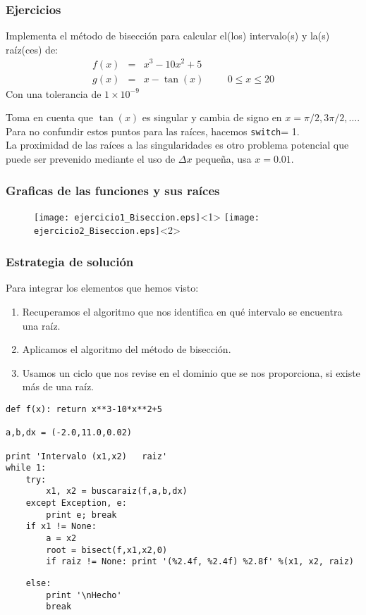 \begin{frame}
\frametitle{Ejercicios}
Implementa el método de bisección para calcular el(los) intervalo(s) y la(s) raíz(ces) de:
\begin{eqnarray*}
	f(x) &=& x^{3} - 10x^{2} + 5 \\
	g(x) &=& x- \tan(x) \hspace{1cm} 0 \leq x \leq 20
\end{eqnarray*}
Con una tolerancia de $1\times 10^{-9}$
\end{frame}
\begin{frame}
Toma en cuenta que $\tan(x)$ es singular y cambia de signo en $x = \pi/2, 3\pi/2,\ldots$. Para no confundir estos puntos para las raíces, hacemos \texttt{switch}= 1.
\\
\medskip
La proximidad de las raíces a las singularidades es otro problema potencial que puede ser prevenido mediante el uso de $\Delta x$ pequeña, usa $x = 0.01$.
\end{frame}
\begin{frame}
\frametitle{Graficas de las funciones y sus raíces}
\begin{figure}
	\centering
	\texttt{[image: ejercicio1\_Biseccion.eps]}<1>
	\texttt{[image: ejercicio2\_Biseccion.eps]}<2>
\end{figure}
\end{frame}
\begin{frame}
\frametitle{Estrategia de solución}
Para integrar los elementos que hemos visto:
\begin{enumerate}
\item Recuperamos el algoritmo que nos identifica en qué intervalo se encuentra una raíz.
\item Aplicamos el algoritmo del método de bisección.
\item Usamos un ciclo que nos revise en el dominio que se nos proporciona, si existe más de una raíz.
\end{enumerate}
\end{frame}
\begin{frame}[fragile]
\begin{lstlisting}
def f(x): return x**3-10*x**2+5

a,b,dx = (-2.0,11.0,0.02)
	
print 'Intervalo (x1,x2)   raiz'
while 1:
    try:
        x1, x2 = buscaraiz(f,a,b,dx)
    except Exception, e:
        print e; break
    if x1 != None:
        a = x2
        root = bisect(f,x1,x2,0)
        if raiz != None: print '(%2.4f, %2.4f) %2.8f' %(x1, x2, raiz)
\end{lstlisting}
\end{frame}
\begin{frame}[fragile]
\begin{lstlisting}
    else:
        print '\nHecho'
        break
\end{lstlisting}
\end{frame}
